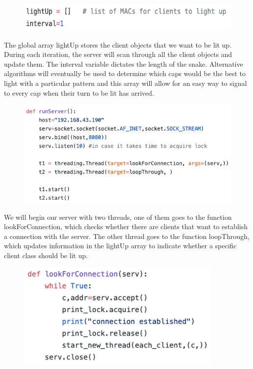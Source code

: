 \documentclass[a4paper,10pt]{article}
\begin{document}
\begin{figure}[H]
  \centering
      \includegraphics[width=\textwidth]{Assets/light_up.png}
\end{figure}

The global array lightUp stores the client objects that we want to be lit up. During each iteration, the server will scan through all the client objects and update them. The interval variable dictates the length of the snake. Alternative algorithms will eventually be used to determine which caps would be the best to light with a particular pattern and this array will allow for an easy way to signal to every cap when their turn to be lit has arrived.

\begin{figure}[H]
  \centering
      \includegraphics[width=\textwidth]{Assets/run_server.png}
\end{figure}

We will begin our server with two threads, one of them goes to the function lookForConnection, which checks whether there are clients that want to establish a connection with the server. The other thread goes to the function loopThrough, which updates information in the lightUp array to indicate whether a specific client class should be lit up. 

\begin{figure}[H]
  \centering
      \includegraphics[width=0.9\textwidth]{Assets/look.png}
\end{figure}
\end{document}
